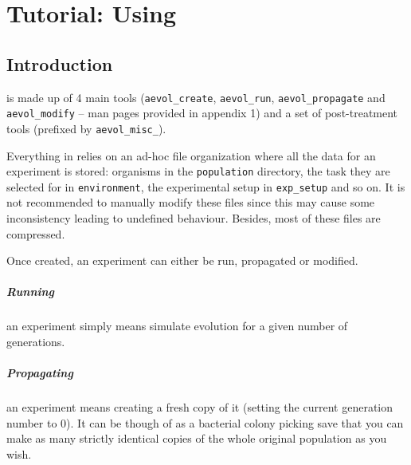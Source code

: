 \chapter{Tutorial: Using \aevol{}}
\label{chap:using-aevol}


\vspace{5mm}

\section{Introduction}

\aevol{} is made up of 4 main tools (\verb?aevol_create?, \verb?aevol_run?, \verb?aevol_propagate? and \verb?aevol_modify? -- man pages provided in appendix 1) and a set of post-treatment tools (prefixed by \verb?aevol_misc_?).

Everything in \aevol{} relies on an ad-hoc file organization where all the data for an experiment is stored: organisms in the \verb?population? directory, the task they are selected for in \verb?environment?, the experimental setup in \verb?exp_setup? and so on. It is not recommended to manually modify these files since this may cause some inconsistency leading to undefined behaviour. Besides, most of these files are compressed.

Once created, an experiment can either be run, propagated or modified.

\vspace{-7mm}
\paragraph{Running}an experiment simply means simulate evolution for a given number of generations.

\vspace{-7mm}
\paragraph{Propagating}an experiment means creating a fresh copy of it (setting the current generation number to 0). It can be though of as a bacterial colony picking save that you can make as many strictly identical copies of the whole original population as you wish.

\vspace{-7mm}
